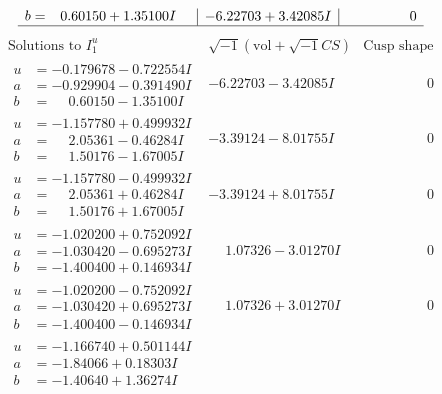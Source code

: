 \documentclass[1p]{elsarticle_modified}
\theoremstyle{definition}
\newcommand{\I}{\sqrt{-1}}
\begin{document}
$$\begin{array}{c|c|c}
\begin{aligned}
b &= \phantom{-}0.60150 + 1.35100 I\end{aligned}
 & -6.22703 + 3.42085 I & \phantom{-0.000000 } 0\\
 \hline 
 \end{array}$$\newpage$$\begin{array}{c|c|c}  
\text{Solutions to }I^u_{1}& \I (\text{vol} + \sqrt{-1}CS) & \text{Cusp shape}\\
 \hline 
\begin{aligned}
u &= -0.179678 - 0.722554 I \\
a &= -0.929904 - 0.391490 I \\
b &= \phantom{-}0.60150 - 1.35100 I\end{aligned}
 & -6.22703 - 3.42085 I & \phantom{-0.000000 } 0 \\ \hline\begin{aligned}
u &= -1.157780 + 0.499932 I \\
a &= \phantom{-}2.05361 - 0.46284 I \\
b &= \phantom{-}1.50176 - 1.67005 I\end{aligned}
 & -3.39124 - 8.01755 I & \phantom{-0.000000 } 0 \\ \hline\begin{aligned}
u &= -1.157780 - 0.499932 I \\
a &= \phantom{-}2.05361 + 0.46284 I \\
b &= \phantom{-}1.50176 + 1.67005 I\end{aligned}
 & -3.39124 + 8.01755 I & \phantom{-0.000000 } 0 \\ \hline\begin{aligned}
u &= -1.020200 + 0.752092 I \\
a &= -1.030420 - 0.695273 I \\
b &= -1.400400 + 0.146934 I\end{aligned}
 & \phantom{-}1.07326 - 3.01270 I & \phantom{-0.000000 } 0 \\ \hline\begin{aligned}
u &= -1.020200 - 0.752092 I \\
a &= -1.030420 + 0.695273 I \\
b &= -1.400400 - 0.146934 I\end{aligned}
 & \phantom{-}1.07326 + 3.01270 I & \phantom{-0.000000 } 0 \\ \hline\begin{aligned}
u &= -1.166740 + 0.501144 I \\
a &= -1.84066 + 0.18303 I \\
b &= -1.40640 + 1.36274 I\end{aligned}

\end{array}$$
\end{document}
